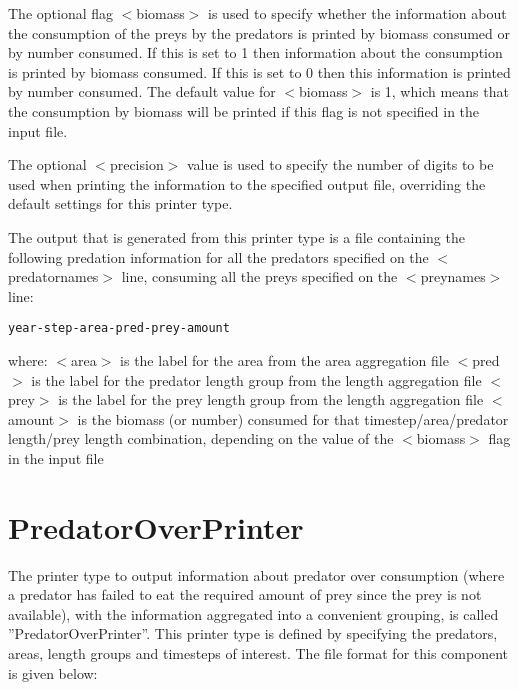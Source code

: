 \documentclass[10pt,twoside]{book}
\begin{document}
\bigskip
The optional flag $<$biomass$>$ is used to specify whether the information about the consumption of the preys by the predators is printed by biomass consumed or by number consumed.  If this is set to 1 then information about the consumption is printed by biomass consumed.  If this is set to 0 then this information is printed by number consumed.  The default value for $<$biomass$>$ is 1, which means that the consumption by biomass will be printed if this flag is not specified in the input file.

\bigskip
The optional $<$precision$>$ value is used to specify the number of digits to be used when printing the information to the specified output file, overriding the default settings for this printer type.

\bigskip
The output that is generated from this printer type is a file containing the following predation information for all the predators specified on the $<$predatornames$>$ line, consuming all the preys specified on the $<$preynames$>$ line:

{\small\begin{verbatim}
year-step-area-pred-prey-amount
\end{verbatim}}

where:\newline
$<$area$>$ is the label for the area from the area aggregation file\newline
$<$pred$>$ is the label for the predator length group from the length aggregation file\newline
$<$prey$>$ is the label for the prey length group from the length aggregation file\newline
$<$amount$>$ is the biomass (or number) consumed for that timestep/area/predator length/prey length combination, depending on the value of the $<$biomass$>$ flag in the input file

\section{PredatorOverPrinter}\label{sec:predatoroverprinter}
The printer type to output information about predator over consumption (where a predator has failed to eat the required amount of prey since the prey is not available), with the information aggregated into a convenient grouping, is called ''PredatorOverPrinter''.  This printer type is defined by specifying the predators, areas, length groups and timesteps of interest.  The file format for this component is given below:
\end{document}
